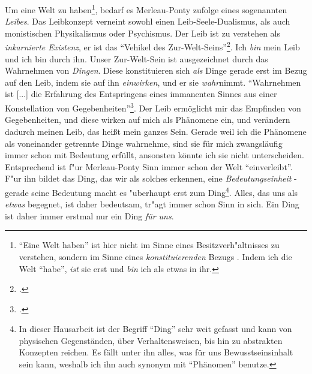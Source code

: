 \documentclass[a4paper, 12pt]{article}
\begin{document}
\begin{onehalfspace}
Um eine Welt zu haben\footnote{"`Eine Welt haben"' ist hier nicht im Sinne eines Besitzverh"altnisses zu verstehen, sondern im Sinne eines \emph{konstituierenden} Bezugs . Indem ich die Welt "`habe"', \emph{ist} sie erst und \emph{bin} ich als etwas in ihr.}, bedarf es Merleau-Ponty zufolge eines sogenannten \emph{Leibes}. Das Leibkonzept verneint sowohl einen Leib-Seele-Dualismus, als auch monistischen Physikalismus oder Psychismus. Der Leib ist zu verstehen als \emph{inkarnierte Existenz}, er ist das "`Vehikel des Zur-Welt-Seins"'\footnote{\Cite[Siehe][S. 106]{merleau1966phanomenologie}.}. Ich \emph{bin} mein Leib und ich bin durch ihn. Unser Zur-Welt-Sein ist ausgezeichnet durch das Wahrnehmen von \emph{Dingen}. Diese konstituieren sich \emph{als} Dinge gerade erst im Bezug auf den Leib, indem sie auf ihn \emph{einwirken}, und er sie \emph{wahr}nimmt. "`Wahrnehmen ist [...] die Erfahrung des Entspringens eines immanenten Sinnes aus einer Konstellation von Gegebenheiten"'\footnote{\Cite[Siehe][S. 42]{merleau1966phanomenologie}.}. Der Leib ermöglicht mir das Empfinden von Gegebenheiten, und diese wirken auf mich als Phänomene ein, und verändern dadurch meinen Leib, das heißt mein ganzes Sein. Gerade weil ich die Phänomene als voneinander getrennte Dinge wahrnehme, sind sie für mich zwangsläufig immer schon mit Bedeutung erfüllt, ansonsten könnte ich sie nicht unterscheiden. Entsprechend ist f"ur Merleau-Ponty Sinn immer schon der Welt "`einverleibt"'. F"ur ihn bildet das Ding, das wir als solches erkennen, eine \emph{Bedeutungseinheit} - gerade seine Bedeutung macht es "uberhaupt erst zum Ding\footnote{In dieser Hausarbeit ist der Begriff "`Ding"' sehr weit gefasst und kann von physischen Gegenständen, über Verhaltensweisen, bis hin zu abstrakten Konzepten reichen. Es fällt unter ihn alles, was für uns Bewusstseinsinhalt sein kann, weshalb ich ihn auch synonym mit "`Phänomen"' benutze.}. Alles, das uns als \emph{etwas} begegnet, ist daher bedeutsam, tr"agt immer schon Sinn in sich. Ein Ding ist daher immer erstmal nur ein Ding \emph{für uns}.


\end{onehalfspace}
\end{document}
